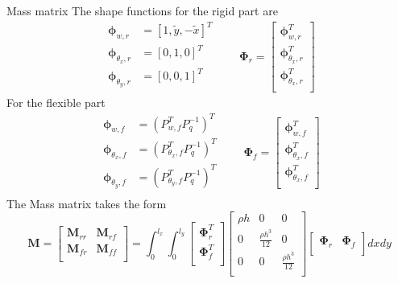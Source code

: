 \documentclass{beamer}
\begin{document}
\begin{frame}{Mass matrix}
The shape functions for the rigid part are 
\begin{equation*}
	\begin{aligned}
	\bm\phi_{w, r} &= [1, \widetilde{y}, -\widetilde{x}]^T \\
	\bm\phi_{\theta_x, r} &= [0, 1, 0]^T \\
	\bm\phi_{\theta_y, r} &= [0, 0, 1]^T \\
	\end{aligned} \qquad
	\bm\Phi_r = \begin{bmatrix}
	\bm\phi_{w, r}^T \\
	\bm\phi_{\theta_x, r}^T \\
	\bm\phi_{\theta_x, r}^T \\
	\end{bmatrix}
\end{equation*}
For the flexible part 
\begin{equation*}
\begin{aligned}
\bm\phi_{w, f} &= (P_{w, f}^T P_q^{-1})^T \\
\bm\phi_{\theta_x, f} &= (P_{\theta_x, f}^T P_q^{-1})^T \\
\bm\phi_{\theta_y, f} &= (P_{\theta_y, f}^T P_q^{-1})^T \\
\end{aligned} \qquad
\bm\Phi_f = \begin{bmatrix}
\bm\phi_{w, f}^T \\
\bm\phi_{\theta_x, f}^T \\
\bm\phi_{\theta_x, f}^T \\
\end{bmatrix}
\end{equation*}
The Mass matrix takes the form
\begin{equation*}
\bm{M} = 
\begin{bmatrix}
\bm{M}_{rr} & \bm{M}_{rf}\\
\bm{M}_{fr} & \bm{M}_{ff}\\
\end{bmatrix} = 
\int_{0}^{l_x} \int_{0}^{l_y}
\begin{bmatrix}
\bm\Phi_r^T \\
\bm\Phi_f^T \\
\end{bmatrix} \begin{bmatrix}
\rho h & 0 & 0\\
0 & \frac{\rho h^3}{12} & 0\\
0 & 0 & \frac{\rho h^3}{12}\\
\end{bmatrix} \begin{bmatrix}
\bm\Phi_r & \bm\Phi_f \\
\end{bmatrix}
dx dy
\end{equation*}
\end{frame}
\end{document}
